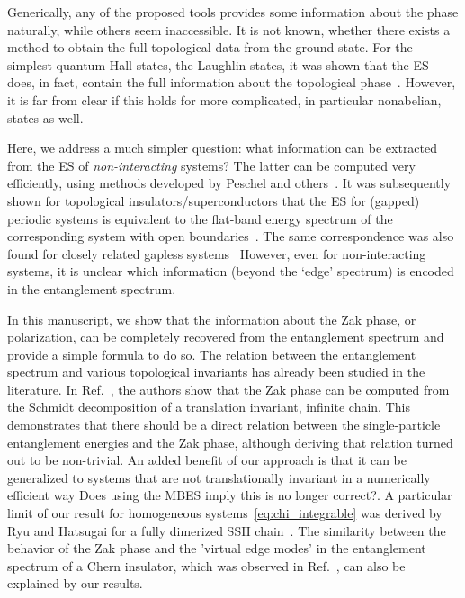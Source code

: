 \documentclass[twocolumn,amsmath,longbibliography,amssymb,superscriptaddress]{revtex4-1}
\newcommand{\carlos}[1]{{\color{red} #1}}
\begin{document}
Generically, any of the proposed tools provides some information about the phase naturally, while others seem inaccessible. 
It is not known, whether there exists a method to obtain the full topological data from the ground state. 
For the simplest quantum Hall states, the Laughlin states,  it was shown that the ES does, in fact, contain the full information about the topological phase~\cite{hermanns2011haldane}.
However, it is far from clear if this holds for more complicated, in particular nonabelian, states as well.  

Here, we address a much simpler question: what information can be extracted from the ES of \emph{non-interacting} systems?
The latter can be computed very efficiently, using methods developed by Peschel and others~\cite{Peschel2003}. 
It was subsequently shown for topological insulators/superconductors that the ES for (gapped) periodic systems is equivalent to the flat-band energy spectrum of the corresponding system with open boundaries~\cite{Fidkowski2010entanglement}. 
The same correspondence was also found for closely related gapless systems~\cite{Matern2018entanglement}
However, even for non-interacting systems, it is unclear which information (beyond the  `edge' spectrum) is encoded in the entanglement spectrum. 

In this manuscript, we show that the information about the Zak phase, or polarization, can be completely recovered from the entanglement spectrum and provide a simple formula to do so. 
The relation between the entanglement spectrum and various topological invariants has already been studied in the literature. 
In Ref.~\cite{Zaletel2014}, the authors show that the Zak phase can be computed from the Schmidt decomposition of a translation invariant, infinite chain. 
This demonstrates that there should be a direct relation between the single-particle entanglement energies and the Zak phase, although deriving that relation turned out to be non-trivial. 
An added benefit of our approach is that it can be generalized to systems that are not translationally invariant in a numerically efficient way \carlos{Does using the MBES imply this is no longer correct?}. 
A particular limit of our result for homogeneous systems~\eqref{eq:chi_integrable} was derived by Ryu and Hatsugai for a fully dimerized SSH chain~\cite{Ryu2006}. 
The similarity between the behavior of the Zak phase and the 'virtual edge modes' in the entanglement spectrum of a Chern insulator, which was observed in Ref.~\cite{Huang2012,Huang2012-2}, can also be explained by our results. 
\end{document}

